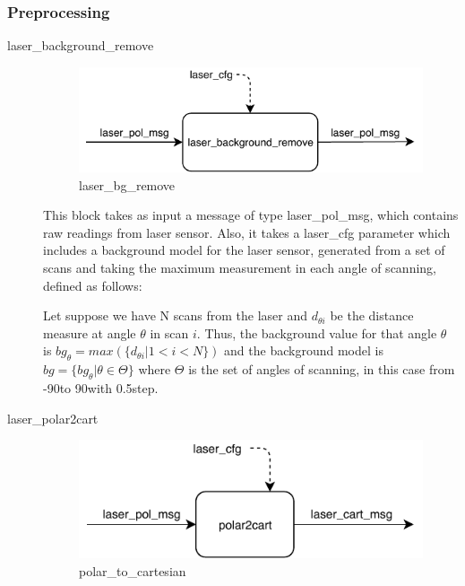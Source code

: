 \subsubsection{Preprocessing}
\begin{description}
\item[laser\_background\_remove] \hfill

\begin{figure}[ht!]
\centering
\includegraphics[scale=0.8]{fig/3/laser_bg_remove.pdf}
\caption{laser\_bg\_remove}
\label{laser_bg_remove}
\end{figure}

This block takes as input a message of type laser\_pol\_msg, which contains raw readings from laser sensor. Also, it takes a laser\_cfg parameter which includes a background model for the laser sensor, generated from a set of scans and taking the maximum measurement in each angle of scanning, defined as follows:

Let suppose we have N scans from the laser and $d_{\theta i}$ be the distance measure at angle $\theta$ in scan $i$. Thus, the background value for that angle $\theta$ is $bg_\theta = max( \{d_{\theta i} | 1 < i < N\})$ and the background model is $bg = \{bg_\theta | \theta \in \Theta\} $ where $\Theta$ is the set of angles of scanning, in this case from -90\degree to 90\degree with 0.5\degree step.

\item[laser\_polar2cart] \hfill

\begin{figure}[ht!]
\centering
\includegraphics[scale=0.8]{fig/3/polar2cart.pdf}
\caption{polar\_to\_cartesian}
\label{polar_to_cartesian}
\end{figure}


\end{description}
